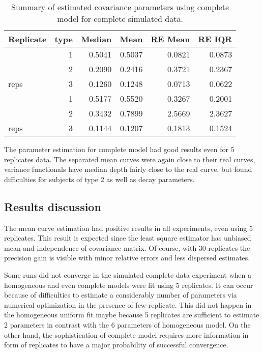 \begin{table}[t]\centering
\caption{Summary of estimated covariance parameters using complete model for complete simulated data.}
\begin{knitrout}
\color{fgcolor}
\begin{tabular}{lrrrrr}
\toprule
Replicate & type & Median & Mean & RE Mean & RE IQR\\
\midrule
 & 1 & 0.5041 & 0.5037 & 0.0821 & 0.0873\\

 & 2 & 0.2090 & 0.2416 & 0.3721 & 0.2367\\

\multirow{-3}{*}{\raggedright\arraybackslash 30 reps} & 3 & 0.1260 & 0.1248 & 0.0713 & 0.0622\\
\cmidrule{1-6}
 & 1 & 0.5177 & 0.5520 & 0.3267 & 0.2001\\

 & 2 & 0.3432 & 0.7899 & 2.5669 & 2.3627\\

\multirow{-3}{*}{\raggedright\arraybackslash 5 reps} & 3 & 0.1144 & 0.1207 & 0.1813 & 0.1524\\
\bottomrule
\end{tabular}


\end{knitrout}
\label{tab:par-comp2comp}
\end{table}


The parameter estimation for complete model had good results even for 5 replicates data. The separated mean curves were again close to their real curves, variance  functionals have median depth fairly close to the real curve, but found difficulties for subjects of type 2 as well as decay parameters.


\subsection{Results discussion}
\label{sec:mpc-disc}

The mean curve estimation had positive results in all experiments, even using 5 replicates. This result is expected since the least square estimator has unbiased mean and independence of covariance matrix. Of course, with 30 replicates the precision gain is visible with minor relative errors and less dispersed estimates.

Some runs did not converge in the simulated complete data experiment when a homogeneous and even complete models were fit using 5 replicates. It can occur because of difficulties to estimate a considerably number of parameters via numerical optimization in the presence of few replicate. This did not happen in the homogeneous uniform fit maybe because 5 replicates are sufficient to estimate 2 parameters in contrast with the 6 parameters of homogeneous model. On the other hand, the sophistication of complete model requires more information in form of replicates to have a major probability of successful convergence.

